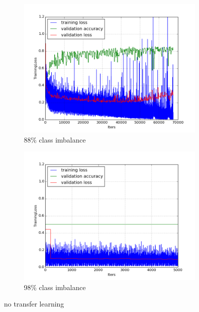 \documentclass[a4paper,11pt]{article}
\begin{document}
\begin{figure}
    \centering
    \begin{minipage}[b]{\textwidth}
      \begin{subfigure}{.5\textwidth} 
        \centering
        \includegraphics[scale=0.4]{images/plot_clampdet_tl_wout.png}
        \caption{88\% class imbalance}\label{fig:2a}
      \end{subfigure}%
      \begin{subfigure}{.5\textwidth} 
        \centering
        \includegraphics[scale=0.4]{images/plot_clampdetCI98_tl_wout.png}
        \caption{98\% class imbalance}\label{fig:2b}
      \end{subfigure} \par \vspace*{20pt} %
      \caption{no transfer learning}\label{fig:2}
    \end{minipage}%
\end{figure}
\end{document}
